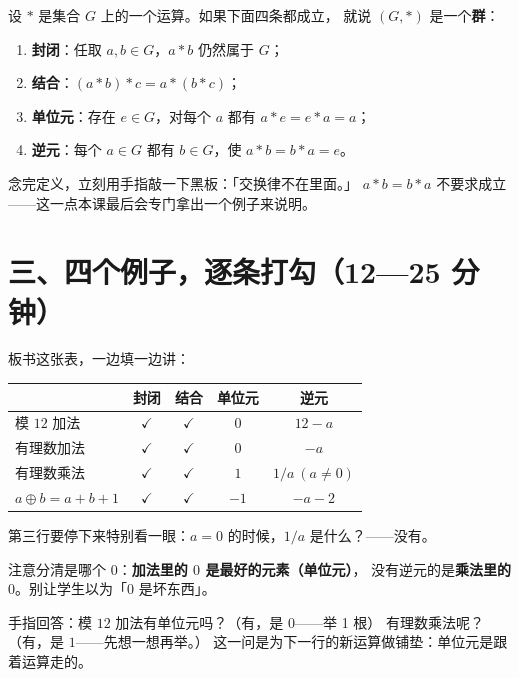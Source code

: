\begin{definition}[群]
  设 \(*\) 是集合 \(G\) 上的一个运算。如果下面四条都成立，
  就说 \((G,*)\) 是一个\textbf{群}：
  \begin{enumerate}
    \item \textbf{封闭}：任取 \(a,b\in G\)，\(a*b\) 仍然属于 \(G\)；
    \item \textbf{结合}：\((a*b)*c=a*(b*c)\)；
    \item \textbf{单位元}：存在 \(e\in G\)，对每个 \(a\) 都有 \(a*e=e*a=a\)；
    \item \textbf{逆元}：每个 \(a\in G\) 都有 \(b\in G\)，使 \(a*b=b*a=e\)。
  \end{enumerate}
\end{definition}

\begin{zhu}
  念完定义，立刻用手指敲一下黑板：「交换律不在里面。」
  \(a*b=b*a\) 不要求成立——这一点本课最后会专门拿出一个例子来说明。
\end{zhu}

\section*{三、四个例子，逐条打勾（12—25 分钟）}

板书这张表，一边填一边讲：

\begin{center}
\begin{tabular}{@{}lcccc@{}}
  \toprule
   & 封闭 & 结合 & 单位元 & 逆元 \\
  \midrule
  模 \(12\) 加法 & \(\checkmark\) & \(\checkmark\) & \(0\) & \(12-a\) \\
  有理数加法 & \(\checkmark\) & \(\checkmark\) & \(0\) & \(-a\) \\
  有理数乘法 & \(\checkmark\) & \(\checkmark\) & \(1\) & \(1/a\ (a\neq0)\) \\
  \(a\oplus b=a+b+1\) & \(\checkmark\) & \(\checkmark\) & \(-1\) & \(-a-2\) \\
  \bottomrule
\end{tabular}
\end{center}

第三行要停下来特别看一眼：\(a=0\) 的时候，\(1/a\) 是什么？——没有。

注意分清是哪个 \(0\)：\textbf{加法里的 \(0\) 是最好的元素（单位元）}，
没有逆元的是\textbf{乘法里的 \(0\)}。别让学生以为「\(0\) 是坏东西」。

\begin{caozuo}
  手指回答：模 \(12\) 加法有单位元吗？（有，是 \(0\)——举 1 根）
  有理数乘法呢？（有，是 \(1\)——先想一想再举。）
  这一问是为下一行的新运算做铺垫：单位元是跟着运算走的。
\end{caozuo}

